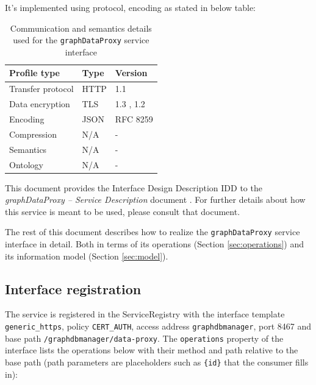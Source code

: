 \documentclass[a4paper]{arrowhead}
\begin{document}
It's implemented using protocol, encoding as stated in below table:
\begin{table}[ht!]
  \centering
  \begin{tabular}{|l|l|l|}
    \hline
    \rowcolor{gray!33} Profile type & Type & Version \\ \hline
    Transfer protocol & HTTP & 1.1 \cite{rfc9112} \\ \hline
    Data encryption & TLS & 1.3 \cite{rfc8446}, 1.2 \cite{rfc5246} \\ \hline
    Encoding & JSON & RFC 8259 \cite{rfc8259} \\ \hline
    Compression & N/A & - \\ \hline
    Semantics & N/A & - \\ \hline
    Ontology & N/A & - \\ \hline
  \end{tabular}
  \caption{Communication and semantics details used for the \texttt{graphDataProxy} service interface}
  \label{tab:comunication_semantics_profile}
\end{table}

This document provides the Interface Design Description IDD to the \textit{graphDataProxy -- Service Description} document \cite{gdm-graphDataProxy-sd}.
For further details about how this service is meant to be used, please consult that document.

The rest of this document describes how to realize the \texttt{graphDataProxy} service
interface in detail. Both in terms of its operations (Section \ref{sec:operations}) and its information model (Section \ref{sec:model}).

\subsection{Interface registration}

The service is registered in the ServiceRegistry with the interface template \texttt{generic\_\allowbreak{}https}, policy \texttt{CERT\_\allowbreak{}AUTH}, access address \texttt{graphdbmanager}, port 8467 and base path \texttt{/\allowbreak{}graphdbmanager/\allowbreak{}data-\allowbreak{}proxy}. The \texttt{operations} property of the interface lists the operations below with their method and path relative to the base path (path parameters are placeholders such as \texttt{\{id\}} that the consumer fills in):
\end{document}
